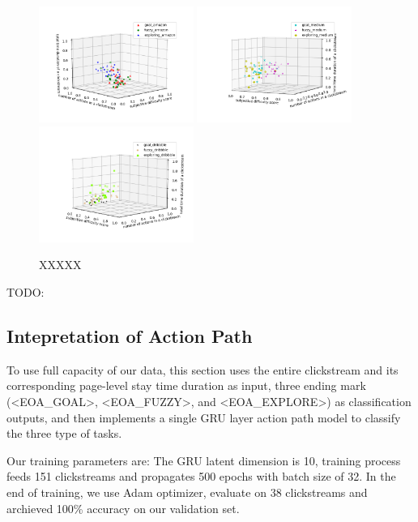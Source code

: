 \begin{figure}[H]
    \centering
    \includegraphics[width=0.45\textwidth]{figures/amazon-general}
    \includegraphics[width=0.45\textwidth]{figures/medium-general}
    \includegraphics[width=0.45\textwidth]{figures/dribbble-general}
    \caption{XXXXX}
    \label{fig:general}
\end{figure}

TODO:

\subsection{Intepretation of Action Path}

To use full capacity of our data, this section uses the entire clickstream and its corresponding
page-level stay time duration as input, three ending mark (<EOA\_GOAL>, <EOA\_FUZZY>, and <EOA\_EXPLORE>) 
as classification outputs, and then implements a single GRU layer action path model 
to classify the three type of tasks.

Our training parameters are: 
The GRU latent dimension is 10, training process feeds 151 clickstreams and 
propagates 500 epochs with batch size of 32.
In the end of training, we use Adam optimizer, evaluate on 38 clickstreams and 
archieved 100\% accuracy on our validation set.

